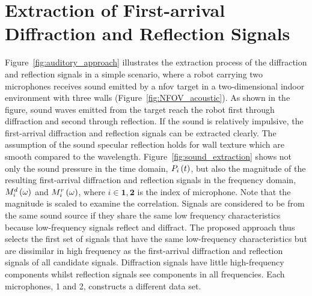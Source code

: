 \documentclass[letterpaper, 10 pt, conference]{ieeeconf}  %
\begin{document}
\section{Extraction of First-arrival Diffraction and Reflection Signals} 
Figure~\ref{fig:auditory_approach} illustrates the extraction process of the diffraction and reflection signals in a simple scenario, where a robot carrying two microphones receives sound emitted by a \gls{nfov} target in a two-dimensional indoor environment with three walls (Figure~\ref{fig:NFOV_acoustic}). As shown in the figure, sound waves emitted from the target reach the robot first through diffraction and second through reflection. If the sound is relatively impulsive, the first-arrival diffraction and reflection signals can be extracted clearly. The assumption of the sound specular reflection holds for wall texture which are smooth compared to the wavelength. Figure~\ref{fig:sound_extraction} shows not only the sound pressure in the time domain, $P_i\left ( t \right )$, but also the magnitude of the resulting first-arrival diffraction and reflection signals in the frequency domain, $M_i^d\left ( \omega \right )$ and $M_i^r\left ( \omega \right )$, where $i \in \bm{1,2}$ is the index of microphone. Note that the magnitude is scaled to examine the correlation. Signals are considered to be from the same sound source if they share the same low frequency characteristics because low-frequency signals reflect and diffract. The proposed approach thus selects the first set of signals that have the same low-frequency characteristics but are dissimilar in high frequency as the first-arrival diffraction and reflection signals of all candidate signals. Diffraction signals have little high-frequency components whilst reflection signals see components in all frequencies. Each microphones, 1 and 2, constructs a different data set.  
\end{document}
